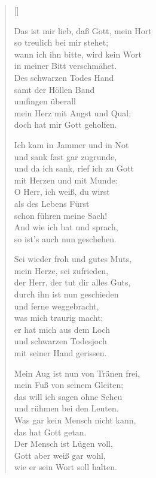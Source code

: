 \begin{multicols}{2}
\settowidth{\versewidth}{Das ist mir lieb, daß Gott, mein Hort,}
\begin{verse}[\versewidth]

 Das ist mir lieb, daß Gott, mein Hort\\
so treulich bei mir stehet;\\
wann ich ihn bitte, wird kein Wort\\
in meiner Bitt verschmähet.\\
Des schwarzen Todes Hand\\
samt der Höllen Band\\
umfingen überall\\
mein Herz mit Angst und Qual;\\
doch hat mir Gott geholfen.

 Ich kam in Jammer und in Not\\
und sank fast gar zugrunde,\\
und da ich sank, rief ich zu Gott\\
mit Herzen und mit Munde:\\
O Herr, ich weiß, du wirst\\
als des Lebens Fürst\\
schon führen meine Sach!\\
And wie ich bat und sprach,\\
so ist's auch nun geschehen.

 Sei wieder froh und gutes Muts,\\
mein Herze, sei zufrieden,\\
der Herr, der tut dir alles Guts,\\
durch ihn ist nun geschieden\\
und ferne weggebracht,\\
was mich traurig macht;\\
er hat mich aus dem Loch\\
und schwarzen Todesjoch\\
mit seiner Hand gerissen.

 Mein Aug ist nun von Tränen frei,\\
mein Fuß von seinem Gleiten;\\
das will ich sagen ohne Scheu\\
und rühmen bei den Leuten.\\
Was gar kein Mensch nicht kann,\\
das hat Gott getan.\\
Der Mensch ist Lügen voll,\\
Gott aber weiß gar wohl,\\
wie er sein Wort soll halten.


\end{verse}
\end{multicols}
